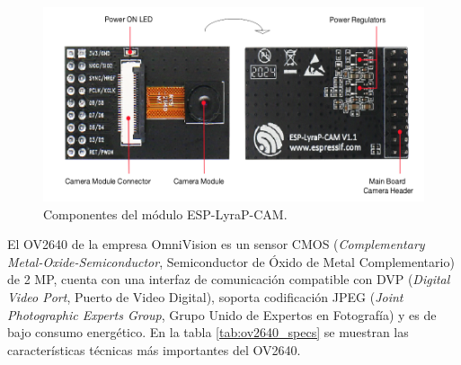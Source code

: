 \begin{figure}[h]
	\centering
	\includegraphics[scale=0.6]{./Figures/camera_blocks.png}
	\caption{Componentes del módulo ESP-LyraP-CAM\protect\footnotemark.}
	\label{fig:camera_comp}
\end{figure}

El OV2640 de la empresa OmniVision es un sensor CMOS (\textit{Complementary Metal-Oxide-Semiconductor}, Semiconductor de Óxido de Metal Complementario) de 2 MP, cuenta con una interfaz de comunicación compatible con DVP  (\textit{Digital Video Port}, Puerto de Video Digital), soporta codificación JPEG (\textit{Joint Photographic Experts Group}, Grupo Unido de Expertos en Fotografía) y es de bajo consumo energético. En la tabla \ref{tab:ov2640_specs} se muestran las características técnicas más importantes del OV2640.

